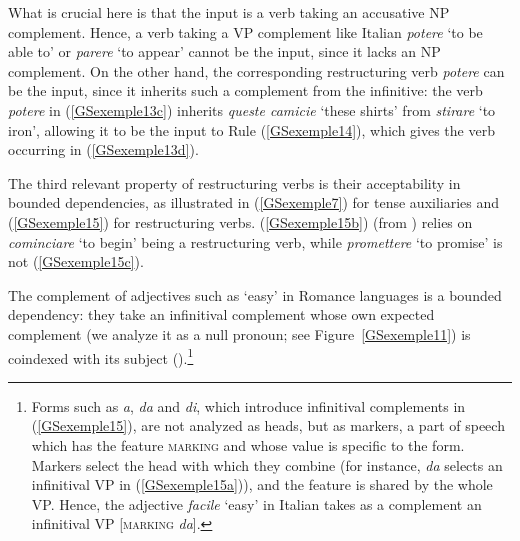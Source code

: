 {What is crucial here is that the input is a verb taking an accusative NP complement. Hence, a verb taking a VP complement like Italian \emph{potere} `to be able to' or \emph{parere} `to appear' cannot be the input, since it lacks an NP complement. On the other hand, the corresponding restructuring verb \emph{potere} can be the input, since it inherits such a complement from the infinitive: the verb \emph{potere} in (\ref{GSexemple13c}) inherits \emph{queste camicie} `these shirts' from \emph{stirare} `to iron', allowing it to be the input to Rule (\ref{GSexemple14}), which gives the verb occurring in (\ref{GSexemple13d}). 

The third relevant property of restructuring verbs is their acceptability in bounded dependencies, as illustrated in (\ref{GSexemple7}) for tense auxiliaries and (\ref{GSexemple15}) for restructuring verbs. (\ref{GSexemple15b}) (from \citealt[341]{Monachesi98a}) relies on \emph{cominciare} `to begin' being a restructuring verb, while \emph{promettere} `to promise' is not (\ref{GSexemple15c}).  

\eal 
	\label{GSexemple15} 
    \label{GSexemple15a} 
		
	\label{GSexemple15b}
		
	\label{GSexemple15c} 	
\zl

The complement of adjectives such as `easy' in Romance languages is a bound\-ed dependency: they take an infinitival complement whose own expected complement (we analyze it as a null pronoun; see Figure~\ref{GSexemple11}) is coindexed with its subject (\citealt{AGS1998, Monachesi98a}).\footnote{Forms such as \emph{a}, \emph{da} and \emph{di}, which introduce infinitival complements in (\ref{GSexemple15}), are not analyzed as heads, but as markers, a part of speech which has the feature \textsc{marking} and whose value is specific to the form. Markers select the head with which they combine (for instance, \emph{da} selects an infinitival VP in (\ref{GSexemple15a})), and the feature is shared by the whole VP. Hence, the adjective \emph{facile} `easy' in Italian takes as a complement an infinitival VP [\textsc{marking} \emph{da}].}

}
